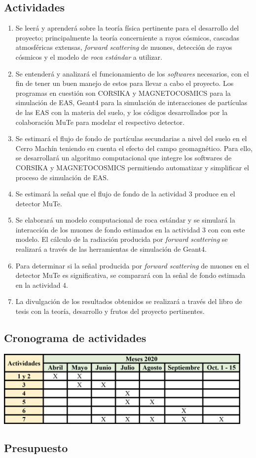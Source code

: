 \documentclass[12pt]{report}
\begin{document}
\subsection*{Actividades}
\begin{enumerate}
    \item Se leerá y aprenderá sobre la teoría física pertinente para el desarrollo del proyecto; principalmente la teoría concerniente a rayos cósmicos, cascadas atmosféricas extensas, \textit{forward scattering} de muones, detección de rayos cósmicos y el modelo de \textit{roca estándar} a utilizar.
    \item Se entenderá y analizará el funcionamiento de los \textit{softwares} necesarios, con el fin de tener un buen manejo de estos para llevar a cabo el proyecto. Los programas en cuestión son CORSIKA y MAGNETOCOSMICS para la simulación de EAS, Geant4 para la simulación de interacciones de partículas de las EAS con la materia del suelo, y los códigos desarrollados por la colaboración MuTe para modelar el respectivo detector.
    \item Se estimará el flujo de fondo de partículas secundarias a nivel del suelo en el Cerro Machín teniendo en cuenta el efecto del campo geomagnético. Para ello, se desarrollará un algoritmo computacional que integre los softwares de CORSIKA y MAGNETOCOSMICS permitiendo automatizar y simplificar el proceso de simulación de EAS.
    \item Se estimará la señal que el flujo de fondo de la actividad 3 produce en el detector MuTe.
    \item Se elaborará un modelo computacional de roca estándar y se simulará la interacción de los muones de fondo estimados en la actividad 3 con con este modelo. El cálculo de la radiación producida por \textit{forward scattering} se realizará a través de las herramientas de simulación de Geant4.
    \item Para determinar si la señal producida por \textit{forward scattering} de muones en el detector MuTe es significativa, se comparará con la señal de fondo estimada en la actividad 4.
    \item La divulgación de los resultados obtenidos se realizará a través del libro de tesis con la teoría, desarrollo y frutos del proyecto pertinentes.
\end{enumerate}

\subsection*{Cronograma de actividades}
\begin{center}
    \includegraphics[width=0.95\textwidth]{images/cronograma.png}
\end{center}


\subsection*{Presupuesto}




\printbibliography
\end{document}
